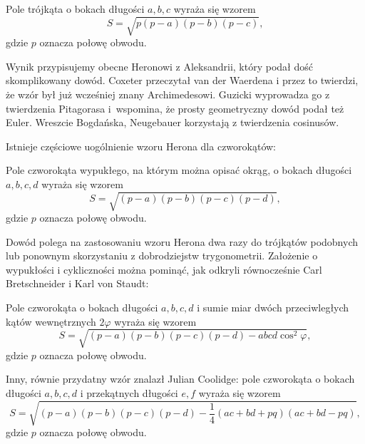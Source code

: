 %

\begin{proposition}
    Pole trójkąta o bokach długości $a, b, c$ wyraża się wzorem
    \begin{equation}
        S = \sqrt{p(p-a)(p-b)(p-c)},
    \end{equation}
    gdzie $p$ oznacza połowę obwodu.
\end{proposition}

Wynik przypisujemy obecne Heronowi z Aleksandrii, który podał dość skomplikowany dowód.
%
Coxeter \cite[s. 12]{coxeter_1991} przeczytał van der Waerdena \cite[s. 228, 277]{waerden_1961} i przez to twierdzi, że wzór był już wcześniej znany Archimedesowi.
%
Guzicki \cite[s. 165-169]{guzicki_2021} wyprowadza go z twierdzenia Pitagorasa i~wspomina, że prosty geometryczny dowód podał też Euler.
%
Wreszcie Bogdańska, Neugebauer \cite[s. 92]{neugebauer_2018} korzystają z twierdzenia cosinusów.

Istnieje częściowe uogólnienie wzoru Herona dla czworokątów:

\begin{proposition}
    Pole czworokąta wypukłego, na którym można opisać okrąg, o bokach długości $a, b, c, d$ wyraża się wzorem
    \begin{equation}
        S = \sqrt{(p-a)(p-b)(p-c)(p-d)},
    \end{equation}
    gdzie $p$ oznacza połowę obwodu.
\end{proposition}

Dowód polega na zastosowaniu wzoru Herona dwa razy do trójkątów podobnych lub ponownym skorzystaniu z dobrodziejstw trygonometrii.
Założenie o wypukłości i cykliczności można pominąć, jak odkryli równocześnie Carl Bretschneider i Karl von Staudt:
%
%

\begin{proposition}
    Pole czworokąta o bokach długości $a, b, c, d$ i sumie miar dwóch przeciwległych kątów wewnętrznych $2 \varphi$ wyraża się wzorem
    \begin{equation}
        S = \sqrt{(p-a)(p-b)(p-c)(p-d) - abcd \cos^2  \varphi},
    \end{equation}
    gdzie $p$ oznacza połowę obwodu.
\end{proposition}

Inny, równie przydatny wzór znalazł Julian Coolidge:
%
pole czworokąta o bokach długości $a, b, c, d$ i przekątnych długości $e, f$ wyraża się wzorem
\begin{equation}
    S = \sqrt{(p-a)(p-b)(p-c)(p-d) - \frac 1 4 (ac + bd + pq)(ac + bd - pq)},
\end{equation}
gdzie $p$ oznacza połowę obwodu.




%